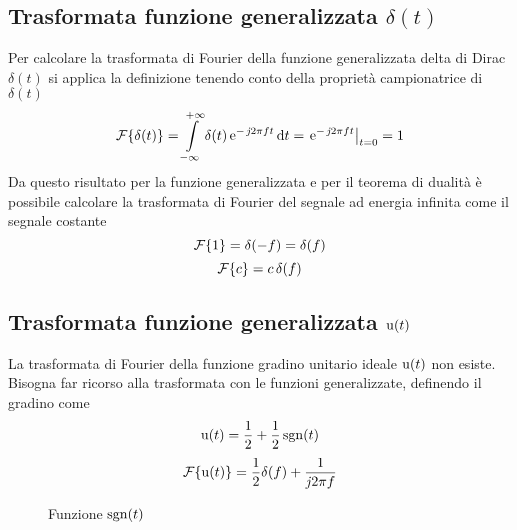 \subsection{Trasformata funzione generalizzata \texorpdfstring{$\delta(t)$}{Delta di Dirac}}
Per calcolare la trasformata di Fourier della funzione generalizzata delta di Dirac $\delta(t)$ si applica la definizione tenendo conto della proprietà campionatrice di $\delta(t)$
\begin{equation}
\operatorname{\mathcal{F}}\!\left\lbrace{\delta(t)}\right\rbrace=\int\limits_{-\infty}^{+\infty}{\delta(t)\operatorname{e}^{-\operatorname{\mathit{j}\!} 2\pi f t}}{\,\mathop{}\!\mathrm{d}{t}}=\left.{\operatorname{e}^{-\operatorname{\mathit{j}\!} 2\pi f t}}\right\rvert_{t=0}=1
\end{equation}
Da questo risultato per la funzione generalizzata e per il teorema di dualità è possibile calcolare la trasformata di Fourier del segnale ad energia infinita come il segnale costante
\begin{equation}
\operatorname{\mathcal{F}}\!\left\lbrace{1}\right\rbrace=\delta(-f)=\delta(f)
\end{equation}
\[\operatorname{\mathcal{F}}\!\left\lbrace{c}\right\rbrace=c\,\delta(f)\]

\subsection{Trasformata funzione generalizzata \texorpdfstring{$\operatorname{u}(t)$}{gradino}}
La trasformata di Fourier della funzione gradino unitario ideale $\operatorname{u}(t)$ non esiste. Bisogna far ricorso alla trasformata con le funzioni generalizzate, definendo il gradino come
\[\operatorname{u}(t)=\frac{1}{2}+\frac{1}{2}\operatorname{sgn}(t)\]
\begin{equation}
\operatorname{\mathcal{F}}\!\left\lbrace{\operatorname{u}(t)}\right\rbrace=\frac{1}{2}\delta(f)+\frac{1}{\operatorname{\mathit{j}\!} 2\pi f}
\end{equation}
\begin{figure}[!ht]
\centering
{}
\caption{Funzione $\operatorname{sgn}(t)$}
\end{figure}

